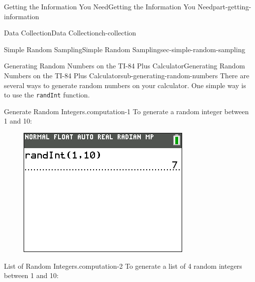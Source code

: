 \documentclass[oneside,10pt,]{book}
\newcommand{\mono}[1]{\texttt{#1}}
\numberwithin{equation}{section}
\newenvironment{codedisplay}
{\VerbatimEnvironment\begin{center}\begin{lrbox}{\codedisplaybox}\begin{BVerbatim}}
{\end{BVerbatim}\end{lrbox}\usebox{\codedisplaybox}\end{center}}
\begin{document}
\begin{partptx}{Getting the Information You Need}{}{Getting the Information You Need}{}{}{part-getting-information}
\begin{chapterptx}{Data Collection}{}{Data Collection}{}{}{ch-collection}
\begin{sectionptx}{Simple Random Sampling}{}{Simple Random Sampling}{}{}{sec-simple-random-sampling}
\typeout{************************************************}
%
\begin{subsectionptx}{Generating Random Numbers on the TI-84 Plus Calculator}{}{Generating Random Numbers on the TI-84 Plus Calculator}{}{}{sub-generating-random-numbers}
\hypertarget{p-9}{}%
There are several ways to generate random numbers on your calculator. One simple way is to use the \mono{randInt} function.%
\begin{computation}{Generate Random Integers.}{computation-1}%
\hypertarget{p-10}{}%
To generate a random integer between 1 and 10:\leavevmode%
%
\begin{figure}\centering\includegraphics[width=0.4\linewidth]{images/randInt-single.png}
\end{figure}\end{computation}
\begin{computation}{List of Random Integers.}{computation-2}%
\hypertarget{p-11}{}%
To generate a list of 4 random integers between 1 and 10:\leavevmode%
\end{computation}
\end{subsectionptx}
\end{sectionptx}
\end{chapterptx}
\end{partptx}
\end{document}

